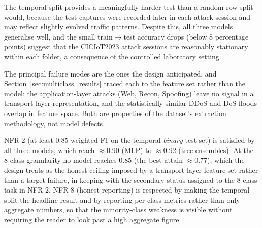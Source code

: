 \par The temporal split provides a meaningfully harder test than a random row split would, because the test captures were recorded later in each attack session and may reflect slightly evolved traffic patterns. Despite this, all three models generalise well, and the small train$\to$test accuracy drops (below 8 percentage points) suggest that the CICIoT2023 attack sessions are reasonably stationary within each folder, a consequence of the controlled laboratory setting.

\par The principal failure modes are the ones the design anticipated, and Section~\ref{sec:multiclass_results} traced each to the feature set rather than the model: the application-layer attacks (Web, Recon, Spoofing) leave no signal in a transport-layer representation, and the statistically similar DDoS and DoS floods overlap in feature space. Both are properties of the dataset's extraction methodology, not model defects.

\par NFR-2 (at least 0.85 weighted F1 on the temporal \emph{binary} test set) is satisfied by all three models, which reach $\approx$0.90 (MLP) to $\approx$0.92 (tree ensembles). At the 8-class granularity no model reaches 0.85 (the best attain $\approx$0.77), which the design treats as the honest ceiling imposed by a transport-layer feature set rather than a target failure, in keeping with the secondary status assigned to the 8-class task in NFR-2. NFR-8 (honest reporting) is respected by making the temporal split the headline result and by reporting per-class metrics rather than only aggregate numbers, so that the minority-class weakness is visible without requiring the reader to look past a high aggregate figure.
